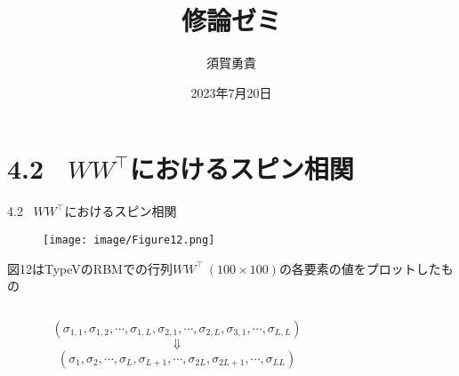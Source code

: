 \documentclass[dvipdfmx,8pt]{beamer}
\title{修論ゼミ}
\author[須賀]{須賀勇貴}
\institute[茨大]{茨城大学大学院 \ 理工学研究科 \ 量子線科学専攻 \ 2年}
\date{2023年7月20日}
\begin{document}
\maketitle
\frame{\tableofcontents[hideallsubsections]}

\section{4.2 \ $WW^{\top}$におけるスピン相関}
\begin{frame}[t]{4.2 \ $WW^{\top}$におけるスピン相関}
  \begin{figure}
    \begin{center}
      \texttt{[image: image/Figure12.png]}
    \end{center}
  \end{figure}
  図12はTypeVのRBMでの行列$WW^{\top} \ (100 \times 100)$の各要素の値をプロットしたもの
  \begin{columns}
    \begin{column}{0.7\textwidth}
      \begin{equation*}
        (\sigma_{1,1},\sigma_{1,2},\cdots,\sigma_{1,L},\sigma_{2,1},\cdots,\sigma_{2,L},\sigma_{3,1},\cdots,\sigma_{L,L})
      \end{equation*}
      \begin{equation*}
        \Downarrow
      \end{equation*}
      \begin{equation*}
        (\sigma_1,\sigma_2,\cdots,\sigma_L,\sigma_{L+1},\cdots,\sigma_{2L},\sigma_{2L+1},\cdots,\sigma_{LL})
      \end{equation*}
    \end{column}
    \begin{column}{0.3\textwidth}
    \end{column}
  \end{columns}
\end{frame}
\end{document}
